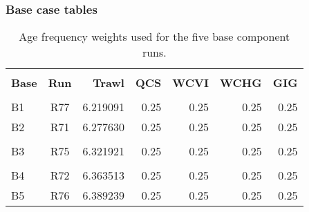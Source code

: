 \documentclass[11pt]{book}
\begin{document}
\clearpage

\subsubsection{Base case tables}

\setlength{\tabcolsep}{6pt}
\begin{table}[!h]
\centering
\caption{Age frequency weights used for the five base component runs.}
\label{tab:baseAFwts}
\usefont{\encodingdefault}{\familydefault}{\seriesdefault}{\shapedefault}\small
\begin{tabular}{lcrrrrr}
\hline \\ [-1.5ex]
{\bf Base} & {\bf Run} & {\bf Trawl} & {\bf QCS} & {\bf WCVI} & {\bf WCHG} & {\bf GIG} \\ [0.2ex]
\hline \\ [-1.5ex]
B1 & R77 & 6.219091 & 0.25 & 0.25 & 0.25 & 0.25 \\
B2 & R71 & 6.277630 & 0.25 & 0.25 & 0.25 & 0.25 \\
\hdashline \\ [-1.75ex]
B3 & R75 & 6.321921 & 0.25 & 0.25 & 0.25 & 0.25 \\
\hdashline \\ [-1.5ex]
B4 & R72 & 6.363513 & 0.25 & 0.25 & 0.25 & 0.25 \\
B5 & R76 & 6.389239 & 0.25 & 0.25 & 0.25 & 0.25 \\
\hline
\end{tabular}
\usefont{\encodingdefault}{\familydefault}{\seriesdefault}{\shapedefault}\normalsize
\end{table}

\end{document}
